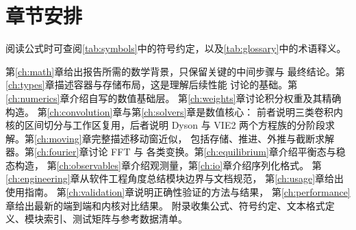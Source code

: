 \section{章节安排}
\label{sec:outline}

阅读公式时可查阅\cref{tab:symbols}中的符号约定，以及\cref{tab:glossary}中的术语释义。

第\ref{ch:math}章给出报告所需的数学背景，只保留关键的中间步骤与
最终结论。第\ref{ch:types}章描述容器与存储布局，这是理解后续性能
讨论的基础。第\ref{ch:numerics}章介绍自写的数值基础层。
第\ref{ch:weights}章讨论积分权重及其精确构造。
第\ref{ch:convolution}章与第\ref{ch:solvers}章是数值核心：
前者说明三类卷积内核的区间切分与工作区复用，后者说明 Dyson 与 VIE2
两个方程族的分阶段求解。第\ref{ch:moving}章完整描述移动窗近似，
包括存储、推进、外推与截断求解器。第\ref{ch:fourier}章讨论 FFT 与
各类变换。第\ref{ch:equilibrium}章介绍平衡态与稳态构造，
第\ref{ch:observables}章介绍观测量，第\ref{ch:io}章介绍序列化格式。
第\ref{ch:engineering}章从软件工程角度总结模块边界与文档规范，
第\ref{ch:usage}章给出使用指南。
第\ref{ch:validation}章说明正确性验证的方法与结果，
第\ref{ch:performance}章给出最新的端到端和内核对比结果。
附录收集公式、符号约定、文本格式定义、模块索引、测试矩阵与参考数据清单。
